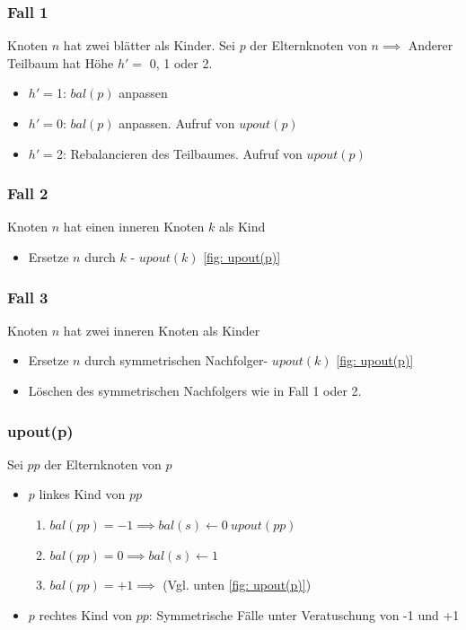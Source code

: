 \documentclass[a4paper]{article}
\begin{document}
\subsubsection*{Fall 1}

Knoten $n$ hat zwei blätter als Kinder. Sei $p$ der Elternknoten von $n \implies $ Anderer Teilbaum hat Höhe $h' =$ 0, 1 oder 2.
\begin{itemize}
    \item $h' = $1: $bal(p)$ anpassen
    \item $h' = $0: $bal(p)$ anpassen. Aufruf von $upout(p)$
    \item $h' = $2: Rebalancieren des Teilbaumes. Aufruf von $upout(p)$
\end{itemize}



\subsubsection*{Fall 2}
Knoten $n$ hat einen inneren Knoten $k$ als Kind
\begin{itemize}
    \item Ersetze $n$ durch $k$ -  $upout(k)$ \ref{fig: upout(p)}
\end{itemize}



\subsubsection*{Fall 3}
Knoten $n$ hat zwei inneren Knoten als Kinder
\begin{itemize}
    \item Ersetze $n$ durch symmetrischen Nachfolger-  $upout(k)$ \ref{fig: upout(p)}
    \item Löschen des symmetrischen Nachfolgers wie in Fall 1 oder 2.
\end{itemize}


\subsubsection*{upout(p)}
Sei $pp$ der Elternknoten von $p$
\begin{itemize}
    \item $p$ linkes Kind von $pp$
        \begin{enumerate}
            \item $bal(pp) = -1 \implies bal(s) \gets 0 \ \textbf{$upout(pp)$}$
            \item $bal(pp) = 0 \implies bal(s) \gets 1 $
            \item $bal(pp) = +1 \implies $ (Vgl. unten \ref{fig: upout(p)})
        \end{enumerate}
    \item $p$ rechtes Kind von $pp$: Symmetrische Fälle unter Veratuschung von -1 und +1
\end{itemize}
\end{document}
